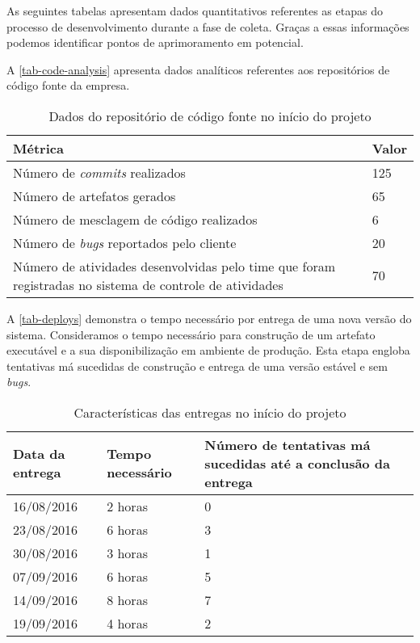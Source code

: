 \documentclass[
	12pt,				%
	openright,			%
	twoside,			%
	a4paper,			%
	english,			%
	french,				%
	spanish,			%
	brazil,				%
	]{abntex2}
\begin{document}
As seguintes tabelas apresentam dados quantitativos referentes as etapas do processo de desenvolvimento durante a fase de coleta. Graças a essas informações podemos identificar pontos de aprimoramento em potencial.

A \autoref{tab-code-analysis} apresenta dados analíticos referentes aos repositórios de código fonte da empresa.

\begin{table}[htb]
	\caption{Dados do repositório de código fonte no início do projeto}
	
	\label{tab-code-analysis}	
	\begin{tabular}{p{7.15cm}|p{7.10cm}}
		\textbf{Métrica} & \textbf{Valor}  \\
		\hline
		Número de \textit{commits} realizados & 125 \\
		\hline
		Número de artefatos gerados & 65 \\
		\hline
		Número de mesclagem de código realizados & 6 \\
		\hline
		Número de \textit{bugs} reportados pelo cliente & 20 \\
		\hline
		Número de atividades desenvolvidas pelo time que foram registradas no sistema de controle de atividades & 70 \\
	\end{tabular}
\end{table}


A \autoref{tab-deploys} demonstra o tempo necessário por entrega de uma nova versão do sistema. Consideramos o tempo necessário para construção de um artefato executável e a sua disponibilização em ambiente de produção. Esta etapa engloba tentativas má sucedidas de construção e entrega de uma versão estável e sem \textit{bugs}.

\begin{table}[htb]
	\caption{Características das entregas no início do projeto}
	
	\label{tab-deploys}	
	\begin{tabular}{p{3.85cm}|p{5.20cm}|p{5.20cm}}
		\textbf{Data da entrega} & \textbf{Tempo necessário} & \textbf{Número de tentativas má sucedidas até a conclusão da entrega}  \\
		\hline
		16/08/2016 & 2 horas & 0 \\
		\hline
		23/08/2016 & 6 horas & 3 \\
		\hline
		30/08/2016 & 3 horas & 1 \\
		\hline
		07/09/2016 & 6 horas & 5 \\
		\hline
		14/09/2016 & 8 horas & 7 \\
		\hline
		19/09/2016 & 4 horas & 2 \\
	\end{tabular}
\end{table}
\end{document}
